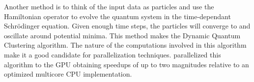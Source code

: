 Another method \cite{Weinstein2009} is to think of the input data as particles and use the Hamiltonian operator to evolve the quantum system in the time-dependant Schrödinger equation.
Given enough time steps, the particles will converge to and oscillate around potential minima.
This method makes the Dynamic Quantum Clustering algorithm.
The nature of the computations involved in this algorithm make it a good candidate for parallelization techniques.
\cite{Wittek2013} parallelized this algorithm to the GPU obtaining speedups of up to two magnitudes relative to an optimized multicore CPU implementation. %



%



%



%

%
